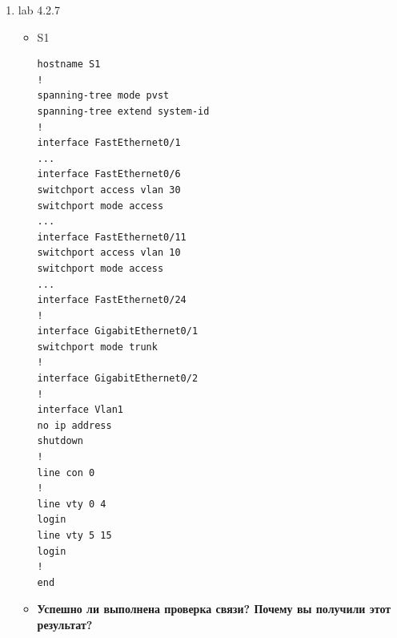 \documentclass[a4paper,14pt]{extarticle}
\begin{document}
\begin{enumerate}
\begin{itemize}
\begin{lstlisting}
hostname SWB
!
spanning-tree mode pvst
spanning-tree extend system-id
!
interface FastEthernet0/1
switchport access vlan 10
switchport mode access
!
interface FastEthernet0/2
switchport access vlan 20
switchport mode access
!
interface FastEthernet0/3
switchport access vlan 30
switchport mode access
... 
interface FastEthernet0/24
!
interface GigabitEthernet0/1
switchport trunk native vlan 100
switchport mode trunk
switchport nonegotiate
!
interface GigabitEthernet0/2
!
interface Vlan1
no ip address
shutdown
!
interface Vlan99
ip address 192.168.99.253 255.255.255.0
!
line con 0
!
line vty 0 4
login
line vty 5 15
login
!
end
            \end{lstlisting}
        \item SWC
            \begin{lstlisting}
hostname SWC
!
spanning-tree mode pvst
spanning-tree extend system-id
!
interface FastEthernet0/1
switchport access vlan 10
switchport mode access
!
interface FastEthernet0/2
switchport access vlan 20
switchport mode access
!
interface FastEthernet0/3
switchport access vlan 30
switchport mode access
!
interface FastEthernet0/4
switchport access vlan 10
switchport mode access
switchport voice vlan 40
...
interface FastEthernet0/24
!
interface GigabitEthernet0/1
!
interface GigabitEthernet0/2
switchport trunk native vlan 100
!
interface Vlan1
no ip address
shutdown
!
interface Vlan99
ip address 192.168.99.254 255.255.255.0
!
line con 0
!
line vty 0 4
login
line vty 5 15
login
!
end
            \end{lstlisting}
        \end{itemize}
        \item lab 4.2.7
        \begin{itemize}
            \item S1
                \begin{lstlisting}
hostname S1
!
spanning-tree mode pvst
spanning-tree extend system-id
!
interface FastEthernet0/1
...
interface FastEthernet0/6
switchport access vlan 30
switchport mode access
...
interface FastEthernet0/11
switchport access vlan 10
switchport mode access
...
interface FastEthernet0/24
!
interface GigabitEthernet0/1
switchport mode trunk
!
interface GigabitEthernet0/2
!
interface Vlan1
no ip address
shutdown
!
line con 0
!
line vty 0 4
login
line vty 5 15
login
!
end
                \end{lstlisting}
            \item \textbf{Успешно ли выполнена проверка связи? Почему вы получили этот результат?}\par

\end{itemize}
\end{enumerate}
\end{document}
